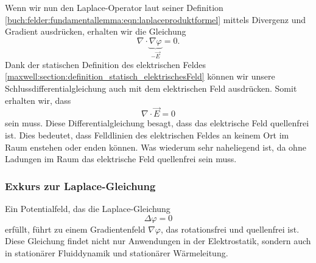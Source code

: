 Wenn wir nun den Laplace-Operator laut seiner Definition \eqref{buch:felder:fundamentallemma:eqn:laplaceproduktformel} mittels Divergenz und Gradient ausdrücken, erhalten wir die Gleichung
\begin{equation}
\nabla\cdot\underbrace{\nabla\varphi}_{\displaystyle-\vec{E}}
=
0.
\label{maxwell:section:laplace_gleichung_3}
\end{equation}
Dank der statischen Definition des elektrischen Feldes \eqref{maxwell:section:definition_statisch_elektrischesFeld} können wir unsere Schlussdifferentialgleichung auch mit dem elektrischen Feld ausdrücken. Somit erhalten wir, dass
\begin{equation}
	\nabla\cdot\vec{E}
	=
	0
	\label{maxwell:section:e_feld_quellenfrei}
\end{equation}
sein muss. Diese Differentialgleichung besagt, dass das elektrische Feld quellenfrei ist.
Dies bedeutet, dass Felldlinien des elektrischen Feldes an keinem Ort im Raum enstehen oder enden können.
Was wiederum sehr naheliegend ist, da ohne Ladungen im Raum das elektrische Feld quellenfrei sein muss.

\subsubsection{Exkurs zur Laplace-Gleichung}
\label{maxwell:section:laplacegleichung_exkurs}
Ein Potentialfeld, das die Laplace-Gleichung
\[
\Delta\varphi
=
0
\]
erfüllt, führt zu einem Gradientenfeld $\nabla\varphi$, das rotationsfrei und quellenfrei ist.
Diese Gleichung findet nicht nur Anwendungen in der Elektrostatik, sondern auch in stationärer Fluiddynamik und stationärer Wärmeleitung.






